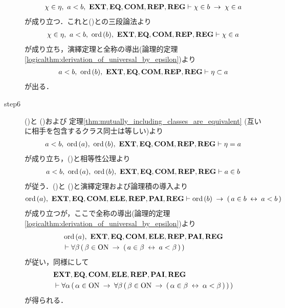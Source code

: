 \begin{prf}
\begin{description}
				\begin{align}
					\chi \in \eta,\ a < b,\ \EXTAX,\EQAX,\COMAX,\REPAX,\REGAX \vdash \chi \in b \rarrow \chi \in a
				\end{align}
				が成り立つ．これと()との三段論法より
				\begin{align}
					\chi \in \eta,\ a < b,\ \ord{b},\ \EXTAX,\EQAX,\COMAX,\REPAX,\REGAX \vdash \chi \in a
				\end{align}
				が成り立ち，演繹定理と全称の導出(論理的定理\ref{logicalthm:derivation_of_universal_by_epsilon})より
				\begin{align}
					a < b,\ \ord{b},\ \EXTAX,\EQAX,\COMAX,\REPAX,\REGAX \vdash \eta \subset a
					\label{fom:element_and_proper_subset_correspond_19}
				\end{align}
				が出る．
			
			\item[step6] ()と
				()および
				定理\ref{thm:mutually_including_classes_are_equivalent} (互いに相手を包含するクラス同士は等しい)より
				\begin{align}
					a < b,\ \ord{a},\ \ord{b},\ \EXTAX,\EQAX,\COMAX,\REPAX,\REGAX \vdash \eta = a
				\end{align}
				が成り立ち，()と相等性公理より
				\begin{align}
					a < b,\ \ord{a},\ \ord{b},\ \EXTAX,\EQAX,\COMAX,\REPAX,\REGAX \vdash a \in b
					\label{fom:element_and_proper_subset_correspond_20}
				\end{align}
				が従う．()と
				()と演繹定理および論理積の導入より
				\begin{align}
					\ord{a},\ \EXTAX,\EQAX,\COMAX,\ELEAX,\REPAX,\PAIAX,\REGAX \vdash 
					\ord{b} \rarrow (\, a \in b \lrarrow a < b\, )
				\end{align}
				が成り立つが，ここで全称の導出(論理的定理\ref{logicalthm:derivation_of_universal_by_epsilon})より
				\begin{align}
					&\ord{a},\ \EXTAX,\EQAX,\COMAX,\ELEAX,\REPAX,\PAIAX,\REGAX \\
					&\vdash \forall \beta\, (\, \beta \in \ON \rarrow (\, a \in \beta \lrarrow a < \beta\, )\, )
				\end{align}
				が従い，同様にして
				\begin{align}
					&\mbox{{\bf EXT}},\mbox{{\bf EQ}},\mbox{\bf COM},\mbox{{\bf ELE}},\mbox{{\bf REP}},\mbox{{\bf PAI}},\mbox{{\bf REG}} \\
					&\vdash \forall \alpha\, (\, \alpha \in \mathrm{ON} \hspace{0.25em}\rightarrow\hspace{0.25em}
					\forall \beta\, (\, \beta \in \mathrm{ON} \hspace{0.25em}\rightarrow\hspace{0.25em} (\, \alpha \in \beta \hspace{0.25em}\leftrightarrow\hspace{0.25em} \alpha < \beta\, )\, )\, )
				\end{align}
				が得られる．
				\QED
		\end{description}
	\end{prf}
	
